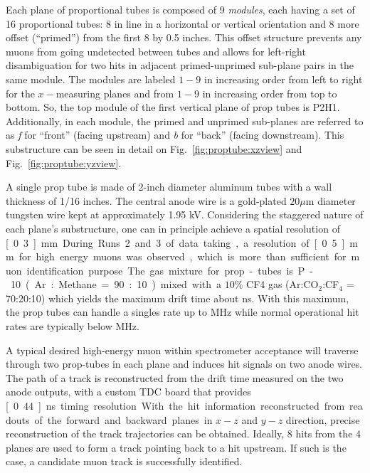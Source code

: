 Each plane of proportional tubes is composed of 9 \emph{modules}, each having a set of 16 proportional tubes: 8 in line in a horizontal or vertical orientation and 8 more offset (``primed'') from the first 8 by 0.5 inches. This offset structure prevents any muons from going undetected between tubes and allows for left-right disambiguation for two hits in adjacent primed-unprimed sub-plane pairs in the same module. The modules are labeled $1-9$ in increasing order from left to right for the $x-$measuring planes and from $1-9$ in increasing order from top to bottom. So, the top module of the first vertical plane of prop tubes is P2H1. Additionally, in each module, the primed and unprimed sub-planes are referred to as \emph{f} for ``front'' (facing upstream) and \emph{b} for ``back'' (facing downstream). This substructure can be seen in detail on Fig.~\ref{fig:proptube:xzview} and Fig.~\ref{fig:proptube:yzview}.

A single prop tube is made of 2-inch diameter aluminum tubes with a wall thickness of 1/16 inches. The central anode wire is a gold-plated $20 \mu$m diameter tungsten wire kept at approximately 1.95 kV. Considering the staggered nature of each plane's substructure, one can in principle achieve a spatial resolution of \unit[0.3]{mm}.  During Runs 2 and 3 of data taking, a resolution of \unit[0.5]{mm} for high energy muons was observed, which is more than sufficient for muon identification purpose. The gas mixture for prop-tubes is P-10 (Ar:Methane = 90:10) mixed with a $10\%$ CF4 gas (Ar:CO$_2$:CF$_4$ = 70:20:10) which yields the maximum drift time about \unit[400]{ns}. With this maximum, the prop tubes can handle a singles rate up to \unit[2]{MHz} while normal operational hit rates are typically below \unit[1]{MHz}.

A typical desired high-energy muon within spectrometer acceptance will traverse through two prop-tubes in each plane and induces hit signals on two anode wires. The path of a track is reconstructed from the drift time measured on the two anode outputs, with a custom TDC board that provides \unit[0.44]{ns} timing resolution. With the hit information reconstructed from readouts of the forward and backward planes in $x-z$ and $y-z$ direction, precise reconstruction of the track trajectories can be obtained. Ideally, 8 hits from the 4 planes are used to form a track pointing back to a hit upstream. If such is the case, a candidate muon track is successfully identified.

